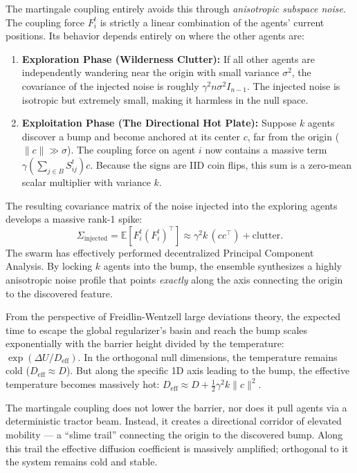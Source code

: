 \documentclass{article}
\begin{document}
The martingale coupling entirely avoids this through \emph{anisotropic subspace noise}. The coupling force $F_i^t$ is strictly a linear combination of the agents' current positions. Its behavior depends entirely on where the other agents are:
\begin{enumerate}
  \item \textbf{Exploration Phase (Wilderness Clutter):} If all other agents are independently wandering near the origin with small variance $\sigma^2$, the covariance of the injected noise is roughly $\gamma^2 n \sigma^2 I_{n-1}$. The injected noise is isotropic but extremely small, making it harmless in the null space.
  \item \textbf{Exploitation Phase (The Directional Hot Plate):} Suppose $k$ agents discover a bump and become anchored at its center $c$, far from the origin ($\|c\| \gg \sigma$). The coupling force on agent $i$ now contains a massive term $\gamma (\sum_{j \in B} S_{ij}^t) c$. Because the signs are IID coin flips, this sum is a zero-mean scalar multiplier with variance $k$.
\end{enumerate}

The resulting covariance matrix of the noise injected into the exploring agents develops a massive rank-1 spike:
\begin{equation}
  \Sigma_{\text{injected}} = \mathbb{E}[F_i^t (F_i^t)^\top] \approx \gamma^2 k \, (c c^\top) + \text{clutter}.
\end{equation}
The swarm has effectively performed decentralized Principal Component Analysis. By locking $k$ agents into the bump, the ensemble synthesizes a highly anisotropic noise profile that points \emph{exactly} along the axis connecting the origin to the discovered feature. 

From the perspective of Freidlin-Wentzell large deviations theory, the expected time to escape the global regularizer's basin and reach the bump scales exponentially with the barrier height divided by the temperature: $\exp(\Delta U / D_{\text{eff}})$. 
In the orthogonal null dimensions, the temperature remains cold ($D_{\text{eff}} \approx D$). But along the specific 1D axis leading to the bump, the effective temperature becomes massively hot: $D_{\text{eff}} \approx D + \frac{1}{2} \gamma^2 k \|c\|^2$.

The martingale coupling does not lower the barrier, nor does it pull agents via a deterministic tractor beam. Instead, it creates a directional corridor of elevated mobility --- a ``slime trail'' connecting the origin to the discovered bump. Along this trail the effective diffusion coefficient is massively amplified; orthogonal to it the system remains cold and stable.
\end{document}
